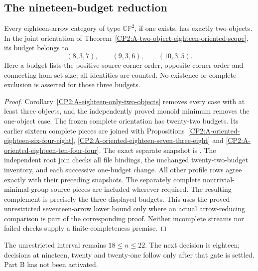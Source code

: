 \subsection{The nineteen-budget reduction}

\begin{corollary}
\label{CP2:A-eighteen-three-two-object-budgets}
Every eighteen-arrow category of type $\mathbb{CP}^2$, if one exists,
has exactly two objects. In the joint orientation of
Theorem~\ref{CP2:A-two-object-eighteen-oriented-scope}, its budget
belongs to
\[
 (8,3,7),\qquad(9,3,6),\qquad(10,3,5).
\]
Here a budget lists the positive source-corner order, opposite-corner
order and connecting hom-set size; all identities are counted.
No existence or complete exclusion is asserted for those three budgets.
\end{corollary}
\begin{proof}
Corollary~\ref{CP2:A-eighteen-only-two-objects} removes every case
with at least three objects, and the independently proved monoid
minimum removes the one-object case. The frozen complete orientation
has twenty-two budgets. Its earlier sixteen complete pieces are
joined with Propositions~\ref{CP2:A-oriented-eighteen-six-four-eight},
\ref{CP2:A-oriented-eighteen-seven-three-eight} and
\ref{CP2:A-oriented-eighteen-ten-four-four}.
The exact separate snapshot is
.
The independent root join
checks all file bindings, the unchanged twenty-two-budget inventory,
and each successive one-budget change. All other profile rows agree
exactly with their preceding snapshots. The separately complete
nontrivial-minimal-group source pieces are included wherever required.
The resulting complement is precisely the three displayed budgets.
This uses the proved unrestricted seventeen-arrow lower bound only
where an actual arrow-reducing comparison is part of the corresponding
proof. Neither incomplete streams nor failed checks supply a
finite-completeness premise.
\end{proof}

\begin{remark*}
The unrestricted interval remains $18\le n\le22$.
The next decision is eighteen; decisions at nineteen, twenty and
twenty-one follow only after that gate is settled.
Part B has not been activated.
\end{remark*}
